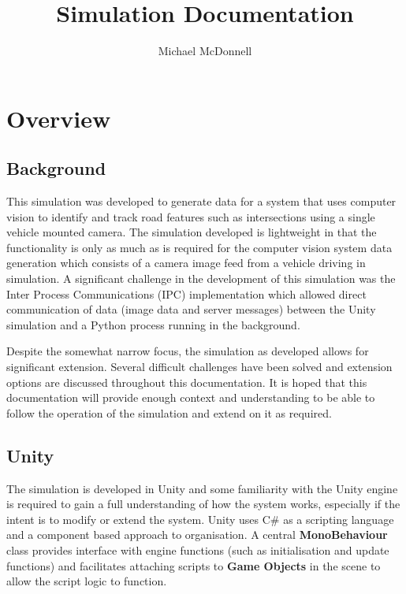 \documentclass{article}
\begin{document}
\title{Simulation Documentation}
\author{Michael McDonnell}

\maketitle

\tableofcontents
\newpage

\section*{Overview}

\subsection*{Background}

This simulation was developed to generate data for a system that uses computer vision to identify and track road features such as intersections using a single vehicle mounted camera. The simulation developed is lightweight in that the functionality is only as much as is required for the computer vision system data generation which consists of a camera image feed from a vehicle driving in simulation. A significant challenge in the development of this simulation was the Inter Process Communications (IPC) implementation which allowed direct communication of data (image data and server messages) between the Unity simulation and a Python process running in the background.

Despite the somewhat narrow focus, the simulation as developed allows for significant extension. Several difficult challenges have been solved and extension options are discussed throughout this documentation. It is hoped that this documentation will provide enough context and understanding to be able to follow the operation of the simulation and extend on it as required.

\subsection*{Unity}

The simulation is developed in Unity and some familiarity with the Unity engine is required to gain a full understanding of how the system works, especially if the intent is to modify or extend the system. Unity uses C\# as a scripting language and a component based approach to organisation. A central \textbf{MonoBehaviour} class provides interface with engine functions (such as initialisation and update functions) and facilitates attaching scripts to \textbf{Game Objects} in the scene to allow the script logic to function. 
\end{document}
